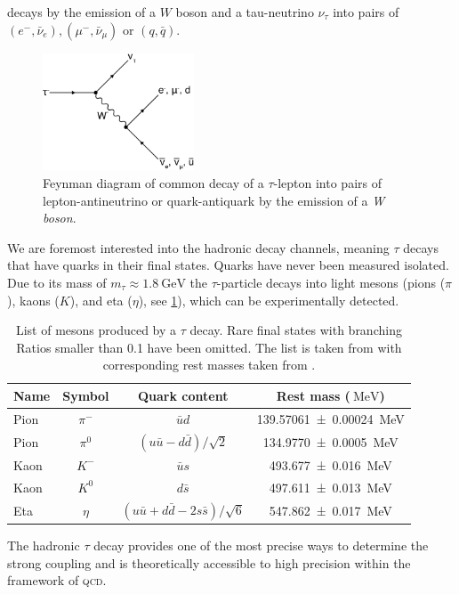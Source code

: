 \documentclass[../../index.tex]{subfiles}
\begin{document}
decays by the emission of a \(W\) boson and a tau-neutrino \(\nu_\tau\) into
pairs of \((e^-, \bar\nu_e), (\mu^-, \bar\nu_\mu)\) or \((q, \bar q)\).
\begin{figure}
  \centering \includegraphics[width=0.4\textwidth]{images/tauDecay.eps}
  \caption{Feynman diagram of common decay of a \(\tau\)-lepton into pairs of
    lepton-antineutrino or quark-antiquark by the emission of a \textit{W
      boson}.}
  \label{fig:tauDecay}
\end{figure}
We are foremost interested into the hadronic decay channels, meaning \(\tau\)
decays that have quarks in their final states. Quarks have never been measured
isolated. Due to its mass of \(m_\tau \approx \SI{1.8}{\giga\electronvolt}\) the
\(\tau\)-particle decays into light mesons (pions (\(\pi\)), kaons (\(K\)), and
eta (\(\eta\)), see \cref{table:lightMesons}), which can be experimentally
detected.
\begin{table}
  \centering
  \begin{tabular}{lccc}
    \toprule
    Name & Symbol & Quark content & Rest mass (\(\SI{}{\mega\electronvolt}\)) \\
    \midrule
    Pion & \(\pi^-\) & \(\bar u d\) & \SI{139.57061 \pm 0.00024}{\mega\electronvolt}  \\
    Pion & \(\pi^0\) & \((u \bar u - d \bar d)/\sqrt{2}\) & \SI{134.9770\pm0.0005}{\mega\electronvolt} \\
    Kaon & \(K^-\) & \(\bar u s\) & \SI{493.677\pm0.016}{\mega\electronvolt} \\
    Kaon & \(K^0\) & \(d \bar s\) & \SI{497.611\pm0.013}{\mega\electronvolt} \\
    Eta & \(\eta\) & \((u \bar u + d \bar d - 2 s \bar s)/\sqrt{6}\) & \SI{547.862\pm0.017}{\mega\electronvolt} \\
  \end{tabular}
  \caption{List of mesons produced by a \(\tau\) decay. Rare final states with
    branching Ratios smaller than 0.1 have been omitted. The list is taken from
    \cite{Davier2006} with corresponding rest masses taken from \cite{PDG2018}.}
  \label{table:lightMesons}
\end{table}
The hadronic \(\tau\) decay provides one of the most precise ways to determine
the strong coupling \cite{Pich2016} and is theoretically accessible to high
precision within the framework of \textsc{qcd}.
\end{document}
